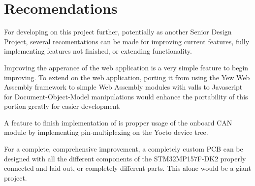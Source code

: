 \documentclass[12pt]{article}
\begin{document}
\section{Recomendations}
For developing on this project further, potentially as another Senior Design Project,
several recomentations can be made for improving current features, fully implementing 
features not finished, or extending functionality. 

Improving the apperance of the web application is a very simple feature to begin
improving. To extend on the web application, porting it from using the Yew 
Web Assembly framework to simple Web Assembly modules with valls to Javascript 
for Document-Object-Model manipulations would enhance the portability of this portion
greatly for easier development.

A feature to finish implementation of is propper usage of the onboard CAN module 
by implementing pin-multiplexing on the Yocto device tree.

For a complete, comprehensive improvement, a completely custom PCB can be designed 
with all the different components of the STM32MP157F-DK2 properly connected
and laid out, or completely different parts. This alone would be a giant project.
\end{document}
